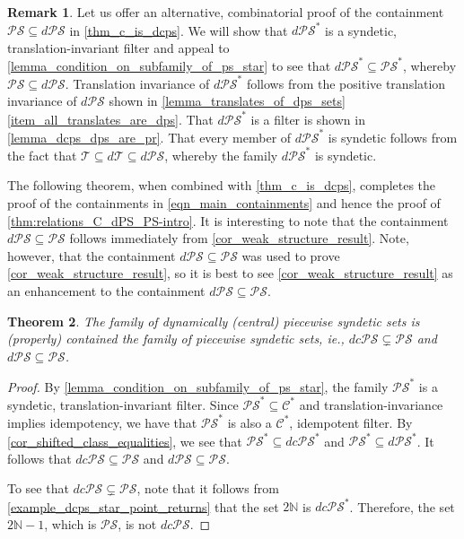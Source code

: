 \documentclass[letter,11pt]{article}
\theoremstyle{plain}
\newtheorem{theorem}{Theorem}
\theoremstyle{definition}
\newtheorem{remark}[theorem]{Remark}
\theoremstyle{plain}
\theoremstyle{plain}
\numberwithin{equation}{section}
\newcommand{\N}{\mathbb{N}}
\newcommand{\thick}{\mathcal{T}}
\newcommand{\dthick}{d\mathcal{T}}
\newcommand{\PS}{\mathcal{PS}}
\newcommand{\dPS}{d\mathcal{PS}}
\newcommand{\dcPS}{dc\mathcal{PS}}
\newcommand{\central}{\mathcal{C}}
\begin{document}
\begin{remark}
    Let us offer an alternative, combinatorial proof of the containment $\PS \subseteq \dPS$ in \cref{thm_c_is_dcps}.  We will show that $\dPS^*$ is a syndetic, translation-invariant filter and appeal to \cref{lemma_condition_on_subfamily_of_ps_star} to see that $\dPS^* \subseteq \PS^*$, whereby $\PS \subseteq \dPS$.  Translation invariance of $\dPS^*$ follows from the positive translation invariance of $\dPS$ shown in \cref{lemma_translates_of_dps_sets} \eqref{item_all_translates_are_dps}. That $\dPS^*$ is a filter is shown in \cref{lemma_dcps_dps_are_pr}.  That every member of $\dPS^*$ is syndetic follows from the fact that $\thick \subseteq \dthick \subseteq \dPS$, whereby the family $\dPS^*$ is syndetic.
\end{remark}



The following theorem, when combined with \cref{thm_c_is_dcps}, completes the proof of the containments in \eqref{eqn_main_containments} and hence the proof of \cref{thm:relations_C_dPS_PS-intro}.  It is interesting to note that the containment $\dPS \subseteq \PS$ follows immediately from \cref{cor_weak_structure_result}.  Note, however, that the containment $\dPS \subseteq \PS$ was used to prove \cref{cor_weak_structure_result}, so it is best to see \cref{cor_weak_structure_result} as an enhancement to the containment $\dPS \subseteq \PS$.

\begin{theorem}
\label{thm_dcps_and_dps_are_ps}
    The family of dynamically (central) piecewise syndetic sets is (properly) contained the family of piecewise syndetic sets, ie., $\dcPS \subsetneq \PS$ and $\dPS \subseteq \PS$.
\end{theorem}

\begin{proof}
    By \cref{lemma_condition_on_subfamily_of_ps_star}, the family $\PS^*$ is a syndetic, translation-invariant filter.  Since $\PS^* \subseteq \central^*$ and translation-invariance implies idempotency, we have that $\PS^*$ is also a $\central^*$, idempotent filter.  By \cref{cor_shifted_class_equalities}, we see that $\PS^* \subseteq \dcPS^*$ and $\PS^* \subseteq \dPS^*$.  It follows that $\dcPS \subseteq \PS$ and $\dPS \subseteq \PS$.

    To see that $\dcPS \subsetneq \PS$, note that it follows from \cref{example_dcps_star_point_returns} that the set $2\N$ is $\dcPS^*$.  Therefore, the set $2\N - 1$, which is $\PS$, is not $\dcPS$.
\end{proof}
\end{document}
